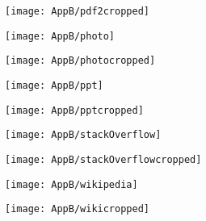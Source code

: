 \documentclass[draft,final]{vutinfth} %
\begin{document}
\begin{appendices}
\begin{figure}[H]
			\begin{subfigure}[b]{0.45\columnwidth}
				\centering
				\texttt{[image: AppB/pdf2cropped]}
			\end{subfigure}
		\end{figure}  
		\begin{figure}[H]
			\centering
			\begin{subfigure}[b]{0.45\columnwidth}
				\centering
				\texttt{[image: AppB/photo]}
			\end{subfigure}
			\begin{subfigure}[b]{0.45\columnwidth}
				\centering
				\texttt{[image: AppB/photocropped]}
			\end{subfigure}
		\end{figure}  
		\begin{figure}[H]
			\centering
			\begin{subfigure}[b]{0.45\columnwidth}
				\centering
				\texttt{[image: AppB/ppt]}
			\end{subfigure}
			\begin{subfigure}[b]{0.45\columnwidth}
				\centering
				\texttt{[image: AppB/pptcropped]}
			\end{subfigure}
		\end{figure}  
		\begin{figure}[H]
			\centering
			\begin{subfigure}[b]{0.45\columnwidth}
				\centering
				\texttt{[image: AppB/stackOverflow]}
			\end{subfigure}
			\begin{subfigure}[b]{0.45\columnwidth}
				\centering
				\texttt{[image: AppB/stackOverflowcropped]}
			\end{subfigure}
		\end{figure} 
		\begin{figure}[H]
			\centering
			\begin{subfigure}[b]{0.45\columnwidth}
				\centering
				\texttt{[image: AppB/wikipedia]}
			\end{subfigure}
			\begin{subfigure}[b]{0.45\columnwidth}
				\centering
				\texttt{[image: AppB/wikicropped]}
			\end{subfigure}
		\end{figure}   
	\end{appendices}
\end{document}
